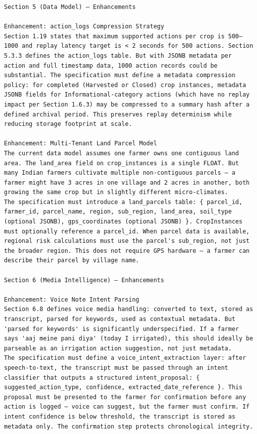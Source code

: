 \documentclass{article}
\begin{document}
\begin{verbatim}
Section 5 (Data Model) — Enhancements

Enhancement: action_logs Compression Strategy
Section 1.19 states that maximum supported actions per crop is 500–1000 and replay latency target is < 2 seconds for 500 actions. Section 5.3.3 defines the action_logs table. But with JSONB metadata per action and full timestamp data, 1000 action records could be substantial. The specification must define a metadata compression policy: for completed (Harvested or Closed) crop instances, metadata JSONB fields for Informational-category actions (which have no replay impact per Section 1.6.3) may be compressed to a summary hash after a defined archival period. This preserves replay determinism while reducing storage footprint at scale.

Enhancement: Multi-Tenant Land Parcel Model
The current data model assumes one farmer owns one contiguous land area. The land_area field on crop_instances is a single FLOAT. But many Indian farmers cultivate multiple non-contiguous parcels — a farmer might have 3 acres in one village and 2 acres in another, both growing the same crop but in slightly different micro-climates.
The specification must introduce a land_parcels table: { parcel_id, farmer_id, parcel_name, region, sub_region, land_area, soil_type (optional JSONB), gps_coordinates (optional JSONB) }. CropInstances must optionally reference a parcel_id. When parcel data is available, regional risk calculations must use the parcel's sub_region, not just the broader region. This does not require GPS hardware — a farmer can describe their parcel by village name.

Section 6 (Media Intelligence) — Enhancements

Enhancement: Voice Note Intent Parsing
Section 6.8 defines voice media handling: converted to text, stored as transcript, parsed for keywords, used as contextual metadata. But 'parsed for keywords' is significantly underspecified. If a farmer says 'aaj meine pani diya' (today I irrigated), this should ideally be parseable as an irrigation action suggestion, not just metadata.
The specification must define a voice_intent_extraction layer: after speech-to-text, the transcript must be passed through an intent classifier that outputs a structured intent_proposal: { suggested_action_type, confidence, extracted_date_reference }. This proposal must be presented to the farmer for confirmation before any action is logged — voice can suggest, but the farmer must confirm. If intent confidence is below threshold, the transcript is stored as metadata only. The confirmation step protects chronological integrity.


\end{verbatim}
\end{document}
